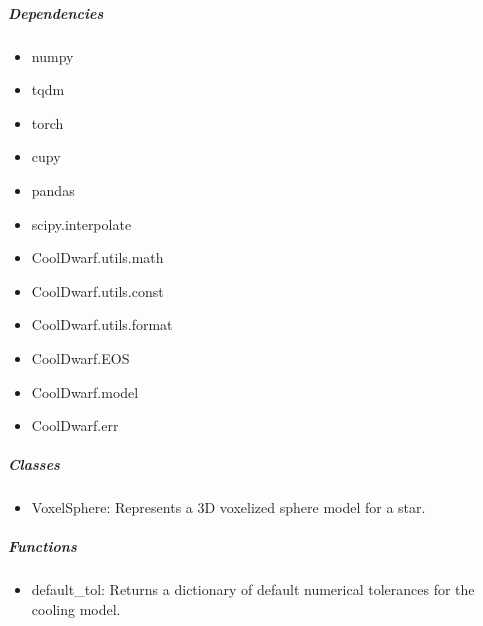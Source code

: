 \documentclass[letterpaper,10pt,english]{sphinxmanual}
\begin{document}
\subparagraph{Dependencies}
\label{\detokenize{CoolDwarf.star:dependencies}}\begin{itemize}
\item {} 
\sphinxAtStartPar
numpy

\item {} 
\sphinxAtStartPar
tqdm

\item {} 
\sphinxAtStartPar
torch

\item {} 
\sphinxAtStartPar
cupy

\item {} 
\sphinxAtStartPar
pandas

\item {} 
\sphinxAtStartPar
scipy.interpolate

\item {} 
\sphinxAtStartPar
CoolDwarf.utils.math

\item {} 
\sphinxAtStartPar
CoolDwarf.utils.const

\item {} 
\sphinxAtStartPar
CoolDwarf.utils.format

\item {} 
\sphinxAtStartPar
CoolDwarf.EOS

\item {} 
\sphinxAtStartPar
CoolDwarf.model

\item {} 
\sphinxAtStartPar
CoolDwarf.err

\end{itemize}


\subparagraph{Classes}
\label{\detokenize{CoolDwarf.star:classes}}\begin{itemize}
\item {} 
\sphinxAtStartPar
VoxelSphere: Represents a 3D voxelized sphere model for a star.

\end{itemize}


\subparagraph{Functions}
\label{\detokenize{CoolDwarf.star:functions}}\begin{itemize}
\item {} 
\sphinxAtStartPar
default\_tol: Returns a dictionary of default numerical tolerances for the cooling model.

\end{itemize}
\end{document}
